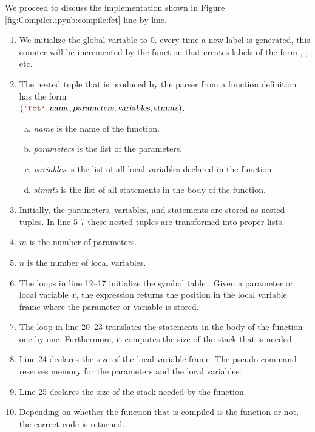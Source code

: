 We proceed to discuss the implementation shown in Figure \ref{fig:Compiler.ipynb:compile:fct} line by line.
\begin{enumerate}
\item We initialize the global variable  to $0$.
      every time a new label is generated, this counter will be incremented by the function 
      that creates labels of the form , , etc.
\item The nested tuple that is produced by the parser from a function definition has the form
      \\[0.2cm]
      \hspace*{1.3cm}
      $(\mytt{'fct'}, \textsl{name}, \textsl{parameters}, \textsl{variables}, \textsl{stmnts})$.
      \begin{enumerate}[(a)]
      \item \textsl{name} is the name of the function.
      \item \textsl{parameters} is the list of the parameters.
      \item \textsl{variables} is the list of all local variables declared in the function.
      \item \textsl{stmnts} is the list of all statements in the body of the function.
      \end{enumerate}
\item Initially, the parameters, variables, and statements are stored as nested tuples.
      In line 5-7 these nested tuples are transformed into proper lists.
\item $m$ is the number of parameters. 
\item $n$ is the number of local variables. 
\item The  loops in line 12--17 initialize the symbol table .
      Given a parameter or local variable $x$, the expression 
      returns the position in the local variable frame where the parameter or variable is stored.
\item The  loop in line 20--23 translates the statements in the body of the function one by one.
  Furthermore, it computes the size of the stack that is needed.
\item Line 24 declares the size of the local variable frame.  The pseudo-command 
  reserves memory for the parameters and the local variables.
\item Line 25 declares the size of the stack needed by the function.
\item Depending on whether the function that is compiled is the function  or not,
  the correct code is returned.
\end{enumerate}


